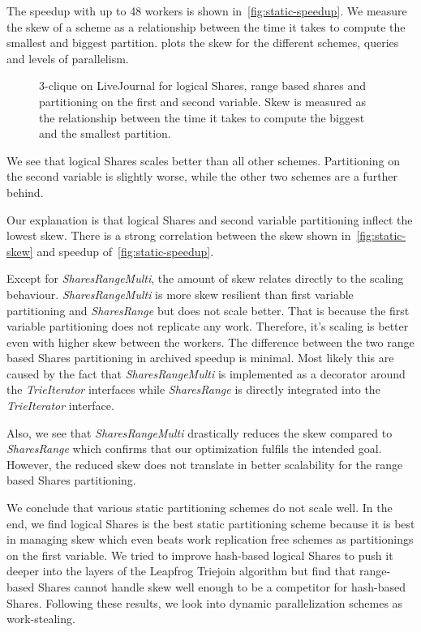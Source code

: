 The speedup with up to 48 workers is shown in~\cref{fig:static-speedup}.
We measure the skew of a scheme as a relationship between the time it takes to compute the smallest and biggest partition.
 plots the skew for the different schemes, queries and levels of parallelism.

\begin{figure}
\caption{3-clique on LiveJournal for logical Shares, range based shares and partitioning on the first and second variable.
Skew is measured as the relationship between the time it takes to compute the biggest and the smallest partition.
}
\end{figure}

We see that logical Shares scales better than all other schemes.
Partitioning on the second variable is slightly worse, while the other two schemes are a further behind.

Our explanation is that logical Shares and second variable partitioning inflect the lowest skew.
There is a strong correlation between the skew shown in~\cref{fig:static-skew} and speedup of~\cref{fig:static-speedup}.

Except for \textit{SharesRangeMulti}, the amount of skew relates directly to the scaling behaviour.
\textit{SharesRangeMulti} is more skew resilient than first variable partitioning and \textit{SharesRange} but does not scale
better.
That is because the first variable partitioning does not replicate any work.
Therefore, it's scaling is better even with higher skew between the workers.
The difference between the two range based Shares partitioning in archived speedup is minimal.
Most likely this are caused by the fact that \textit{SharesRangeMulti} is implemented as a decorator around the
\textit{TrieIterator} interfaces while \textit{SharesRange} is directly integrated into the \textit{TrieIterator} interface.

Also, we see that \textit{SharesRangeMulti} drastically reduces the skew compared to \textit{SharesRange} which confirms that our
optimization fulfils the intended goal.
However, the reduced skew does not translate in better scalability for the range based Shares partitioning.

We conclude that various static partitioning schemes do not scale well.
In the end, we find logical Shares is the best static partitioning scheme because it is best in managing skew which even beats work
replication free schemes as partitionings on the first variable.
We tried to improve hash-based logical Shares to push it deeper into the layers of the Leapfrog Triejoin algorithm but find that
range-based Shares cannot handle skew well enough to be a competitor for hash-based Shares.
Following these results, we look into dynamic parallelization schemes as work-stealing.

